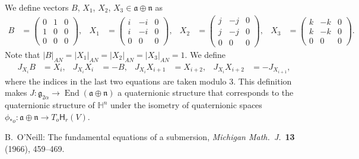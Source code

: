 \documentclass[12pt, a4paper]{amsart}
\newcommand{\g}{\mathfrak}
\renewcommand{\H}{\mathbb{H}}
\theoremstyle{remark}
\begin{document}
We define vectors $B$, $X_{1}$, $X_{2}$, $X_{3}\in\g{a}\oplus \g{n}$ as
\[
\begin{aligned}
B
&{}=\left(
\begin{array}{cc|c}
	0 & 1 & 0 \\
	1 & 0 & 0 \\
	\hline
	0 & 0 & 0
\end{array}
\right),&
X_{1}
&{}=\left(
\begin{array}{cc|c}
i & -i & 0 \\
i & -i & 0 \\
\hline
0 & 0 & 0
\end{array}
\right),&
X_{2}
&{}=\left(
\begin{array}{cc|c}
j & -j & 0 \\
j & -j & 0 \\
\hline
0 & 0 & 0
\end{array}
\right),&
X_{3}
&{}=\left(
\begin{array}{cc|c}
k & -k & 0 \\
k & -k & 0 \\
\hline
0 & 0 & 0
\end{array}
\right).
\end{aligned}
\]
Note that $\lvert B\rvert_{AN}=\lvert X_1\rvert_{AN}=\lvert X_2\rvert_{AN}=\lvert X_3\rvert_{AN}=1$.
We define
\[
\begin{aligned}
J_{X_{i}}B&{}=X_{i},&
J_{X_{i}}X_{i}&{}=-B,&
J_{X_{i}}X_{i+1}&{}=X_{i+2},&
J_{X_{i}}X_{i+2}&{}=-J_{X_{i+1}},
\end{aligned}
\]
where the indices in the last two equations are taken modulo $3$.
This definition makes $J\colon\g{g}_{2\alpha}\to\operatorname{End}(\g{a}\oplus\g{n})$ a quaternionic structure that corresponds to the quaternionic structure of $\H^n$ under the isometry of quaternionic spaces $\phi_{*o}\colon\g{a}\oplus\g{n}\to T_o\mathsf{H}_r(V)$.
	


\begin{thebibliography}{99}
B.~O'Neill: The fundamental equations of a submersion, \textit{Michigan Math.\ J.}\ \textbf{13} (1966), 459--469.
\end{thebibliography}
\end{document}
